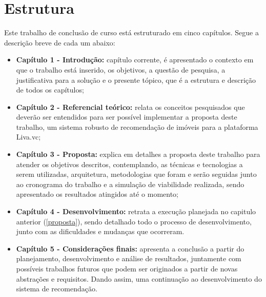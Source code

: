 \section{Estrutura}

Este trabalho de conclusão de curso está estruturado em cinco capítulos. Segue a descrição breve de cada um abaixo:

\begin{itemize}
    \item \textbf{Capítulo 1 - Introdução:} capítulo corrente, é apresentado o contexto em que o trabalho está inserido, os objetivos, a questão de pesquisa, a justificativa para a solução e o presente tópico, que é a estrutura e descrição de todos os capítulos;

    \item \textbf{Capítulo 2 - Referencial teórico:} relata os conceitos pesquisados que deverão ser entendidos para ser possível implementar a proposta deste trabalho, um sistema robusto de recomendação de imóveis para a plataforma Liva.vc;
    
   \item \textbf{Capítulo 3 - Proposta:} explica em detalhes a proposta deste trabalho para atender os objetivos descritos, contemplando, as técnicas e tecnologias a serem utilizadas, arquitetura, metodologias que foram e serão seguidas junto ao cronograma do trabalho e a simulação de viabilidade realizada, sendo apresentado os resultados atingidos até o momento;
   
   \item \textbf{Capítulo 4 - Desenvolvimento:} retrata a execução planejada no capitulo anterior (\ref{proposta}), sendo detalhado todo o processo de desenvolvimento, junto com as dificuldades e mudanças que ocorreram.

   \item \textbf{Capítulo 5 - Considerações finais:} apresenta a conclusão a partir do planejamento, desenvolvimento e análise de resultados, juntamente com possíveis trabalhos futuros que podem ser originados a partir de novas abstrações e requisitos. Dando assim, uma continuação ao desenvolvimento do sistema de recomendação.
\end{itemize}
